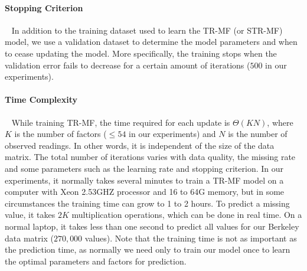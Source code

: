 
\paragraph*{Stopping Criterion} ~
In addition to the training dataset used to learn the TR-MF (or STR-MF) model, we use a validation 
dataset to determine the model parameters and when to cease updating the model. 
More specifically, the training stops when the validation error fails to decrease for a certain 
amount of iterations ($500$ in our experiments). 

\paragraph*{Time Complexity} ~
While training TR-MF, the time required for each update is $\Theta(KN)$, where $K$ is the number 
of factors ($\leq 54$ in our experiments) and $N$ is the number of observed readings.
In other words, it is independent of the size of the data matrix. 
The total number of iterations varies with data quality, the missing rate and some parameters such as the learning rate and stopping criterion.
In our experiments, it normally takes several minutes to train a TR-MF model on a computer with Xeon 2.53GHZ processor and 16 to 64G memory, but in some circumstances the training time can grow to 1 to 2 hours.
To predict a missing value, it takes $2K$ multiplication operations, which can be done in real time. 
On a normal laptop, it takes less than one second to predict all values for our Berkeley data matrix ($270,000$ values).
Note that the training time is not as important as the prediction time, as normally we need only to train our model once to learn the optimal parameters and factors for prediction.

